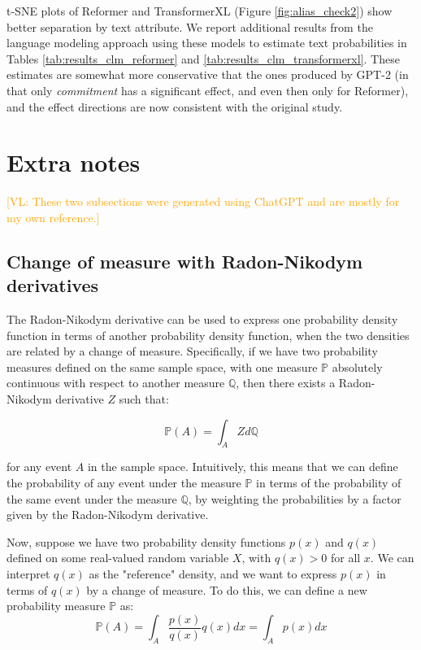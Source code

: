 \documentclass{article}
\newcommand{\vl}[1]{\textcolor{orange}{[VL: #1]}}
\begin{document}
t-SNE plots of Reformer \cite{kitaev2020reformer} and TransformerXL \cite{dai2019transformerxl} (Figure \ref{fig:alias_check2}) show better separation by text attribute. We report additional results from the language modeling approach using these models to estimate text probabilities in Tables \ref{tab:results_clm_reformer} and \ref{tab:results_clm_transformerxl}. These estimates are somewhat more conservative that the ones produced by GPT-2 (in that only \textit{commitment} has a significant effect, and even then only for Reformer), and the effect directions are now consistent with the original study. 

\newpage
\appendix

\section{Extra notes}

\vl{These two subsections were generated using ChatGPT and are mostly for my own reference.}

\subsection{Change of measure with Radon-Nikodym derivatives}
\label{sec:change_of_measure}

The Radon-Nikodym derivative can be used to express one probability density function in terms of another probability density function, when the two densities are related by a change of measure. Specifically, if we have two probability measures defined on the same sample space, with one measure $\mathbb{P}$ absolutely continuous with respect to another measure $\mathbb{Q}$, then there exists a Radon-Nikodym derivative $Z$ such that:

$$\mathbb{P}(A) = \int_A Z d\mathbb{Q}$$

for any event $A$ in the sample space. Intuitively, this means that we can define the probability of any event under the measure $\mathbb{P}$ in terms of the probability of the same event under the measure $\mathbb{Q}$, by weighting the probabilities by a factor given by the Radon-Nikodym derivative.

Now, suppose we have two probability density functions $p(x)$ and $q(x)$ defined on some real-valued random variable $X$, with $q(x)>0$ for all $x$. We can interpret $q(x)$ as the "reference" density, and we want to express $p(x)$ in terms of $q(x)$ by a change of measure. To do this, we can define a new probability measure $\mathbb{P}$ as:
$$\mathbb{P}(A) = \int_A \frac{p(x)}{q(x)} q(x) dx = \int_A p(x) dx$$
\end{document}
